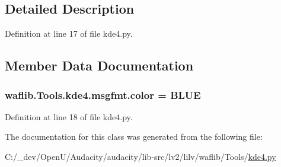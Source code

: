 \subsection{Detailed Description}


Definition at line 17 of file kde4.\+py.



\subsection{Member Data Documentation}
\subsubsection[{\texorpdfstring{color}{color}}]{ waflib.\+Tools.\+kde4.\+msgfmt.\+color = \textquotesingle{}B\+L\+UE\textquotesingle{}\hspace{0.3cm}{\ttfamily [static]}}\hypertarget{classwaflib_1_1_tools_1_1kde4_1_1msgfmt_a84052c896ddb59b9dca9c9e71e892b3e}{}\label{classwaflib_1_1_tools_1_1kde4_1_1msgfmt_a84052c896ddb59b9dca9c9e71e892b3e}


Definition at line 18 of file kde4.\+py.



The documentation for this class was generated from the following file\+:\begin{DoxyCompactItemize}
\item 
C\+:/\+\_\+dev/\+Open\+U/\+Audacity/audacity/lib-\/src/lv2/lilv/waflib/\+Tools/\hyperlink{lilv_2waflib_2_tools_2kde4_8py}{kde4.\+py}\end{DoxyCompactItemize}
